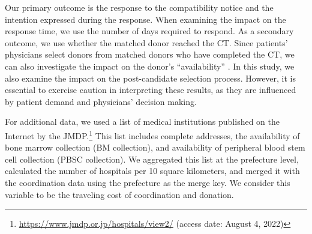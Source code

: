 \documentclass[12pt, a4paper]{article}
\begin{document}
Our primary outcome is the response to the compatibility notice and the intention expressed during the response. When examining the impact on the response time, we use the number of days required to respond. As a secondary outcome, we use whether the matched donor reached the CT. Since patients' physicians select donors from matched donors who have completed the CT, we can also investigate the impact on the donor's ``availability'' \citep{Haylock2022}. In this study, we also examine the impact on the post-candidate selection process. However, it is essential to exercise caution in interpreting these results, as they are influenced by patient demand and physicians' decision making.

For additional data, we used a list of medical institutions published on the Internet by the JMDP.\footnote{\url{https://www.jmdp.or.jp/hospitals/view2/} (access date: August 4, 2022)} This list includes complete addresses, the availability of bone marrow collection (BM collection), and availability of peripheral blood stem cell collection (PBSC collection). We aggregated this list at the prefecture level, calculated the number of hospitals per 10 square kilometers, and merged it with the coordination data using the prefecture as the merge key. We consider this variable to be the traveling cost of coordination and donation.
\end{document}
